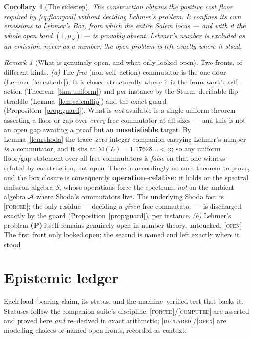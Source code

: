 \documentclass[11pt]{article}
\theoremstyle{plain}
\newtheorem{corollary}[theorem]{Corollary}
\theoremstyle{definition}
\theoremstyle{remark}
\newtheorem{remark}[theorem]{Remark}
\newcommand{\forced}{\textcolor{forcedc}{\textsc{[forced]}}}
\newcommand{\declared}{\textcolor{declaredc}{\textsc{[declared]}}}
\newcommand{\openq}{\textcolor{openc}{\textsc{[open]}}}
\newcommand{\computed}{\textcolor{forcedc}{\textsc{[computed]}}}
\newcommand{\Mah}{\mathrm{M}}
\newcommand{\Scal}{\mathcal{S}}
\newcommand{\Acal}{\mathcal{A}}
\begin{document}
\begin{corollary}[The sidestep]\label{cor:sidestep}
The construction obtains the positive cost floor required by \eqref{eq:floorgoal} without deciding Lehmer's problem. It confines its own emissions to Lehmer's Box, from which the entire Salem locus --- and with it the whole open band $(1,\mu_S)$ --- is provably absent. Lehmer's number is excluded as an emission, never as a number; the open problem is left exactly where it stood.
\end{corollary}

\begin{remark}[What is genuinely open, and what only looked open]\label{rem:residue}
Two fronts, of different kinds. \emph{(a)} The \emph{free} (non--self--action) commutator is the one door (Lemma~\ref{lem:shoda}). It is closed structurally where it is the framework's self--action (Theorem~\ref{thm:uniform}) and per instance by the Sturm--decidable flip--straddle (Lemma~\ref{lem:salemflip}) and the exact guard (Proposition~\ref{prop:guard}). What is \emph{not} available is a single uniform theorem asserting a floor or gap over \emph{every} free commutator at all sizes --- and this is not an open gap awaiting a proof but an \textbf{unsatisfiable} target. By Lemma~\ref{lem:shoda} the trace--zero integer companion carrying Lehmer's number \emph{is} a commutator, and it sits at $\Mah(L)=1.17628\ldots<\varphi$; so any uniform floor/gap statement over all free commutators is \emph{false} on that one witness --- refuted by construction, not open. There is accordingly no such theorem to prove, and the box closure is consequently \textbf{operation--relative}: it holds on the spectral emission algebra $\Scal$, whose operations force the spectrum, \emph{not} on the ambient algebra $\Acal$ where Shoda's commutators live. The underlying Shoda fact is \forced{}; the only residue --- deciding a \emph{given} free commutator --- is discharged exactly by the guard (Proposition~\ref{prop:guard}), per instance. \emph{(b)} Lehmer's problem \textbf{(P)} itself remains genuinely open in number theory, untouched. \openq{} The first front only looked open; the second is named and left exactly where it stood.
\end{remark}

\section{Epistemic ledger}\label{sec:ledger}

Each load--bearing claim, its status, and the machine--verified test that backs it. Statuses follow the companion suite's discipline: \forced{}/\computed{} are asserted and proved here \emph{and} re--derived in exact arithmetic; \declared{}/\openq{} are modelling choices or named open fronts, recorded as context.
\end{document}
